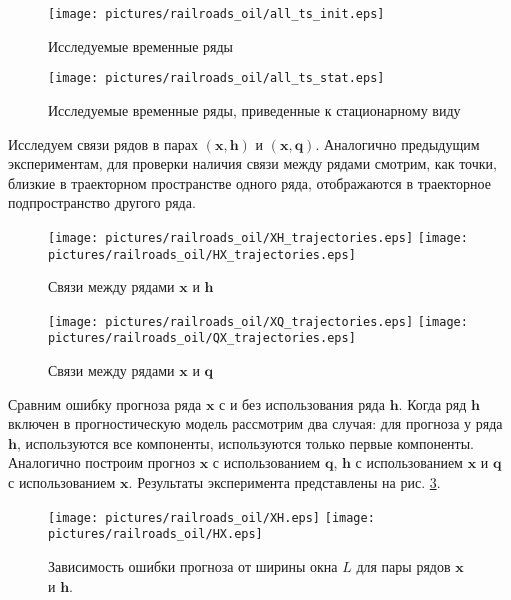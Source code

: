\documentclass[14pt]{article}
\newcommand{\bh}{\mathbf{h}}
\newcommand{\bq}{\mathbf{q}}
\newcommand{\bx}{\mathbf{x}}
\begin{document}
\begin{figure}[H]
\begin{center}
\texttt{[image: pictures/railroads\_oil/all\_ts\_init.eps]}\caption{Исследуемые временные ряды}
\label{railroads_init_ts}
\end{center}
\end{figure}

\begin{figure}[H]
\begin{center}
\texttt{[image: pictures/railroads\_oil/all\_ts\_stat.eps]}
\caption{Исследуемые временные ряды, приведенные к стационарному виду}
\label{railroads_stat_ts}
\end{center}
\end{figure}

Исследуем связи рядов в парах $(\bx, \bh)$ и $(\bx, \bq)$. 
Аналогично предыдущим экспериментам, для проверки наличия связи между рядами смотрим, как точки, близкие в траекторном пространстве одного ряда, отображаются в траекторное подпространство другого ряда.


\begin{figure}[H]
\begin{center}
\texttt{[image: pictures/railroads\_oil/XH\_trajectories.eps]}
\texttt{[image: pictures/railroads\_oil/HX\_trajectories.eps]}
\caption{Связи между рядами $\bx$ и $\bh$}
\end{center}
\end{figure}


\begin{figure}[H]
\begin{center}
\texttt{[image: pictures/railroads\_oil/XQ\_trajectories.eps]}
\texttt{[image: pictures/railroads\_oil/QX\_trajectories.eps]}
\caption{Связи между рядами $\bx$ и $\bq$}
\end{center}
\end{figure}


Сравним ошибку прогноза ряда $\bx$ с и без использования ряда $\bh$. Когда ряд $\bh$  включен в прогностическую модель рассмотрим два случая:
для прогноза у ряда $\bh$, используются  все компоненты, используются только первые компоненты. 
Аналогично построим прогноз $\bx$ с использованием $\bq$, $\bh$ с использованием $\bx$ и $\bq$ с использованием $\bx$. Результаты эксперимента представлены на рис. \ref{mse_railroads}.

\begin{figure}[H]
\begin{center}
\texttt{[image: pictures/railroads\_oil/XH.eps]}
\texttt{[image: pictures/railroads\_oil/HX.eps]}
\caption{Зависимость ошибки прогноза от ширины окна $L$ для пары рядов $\bx$ и $\bh$.}
\label{mse_railroads}
\end{center}
\end{figure}
\end{document}
